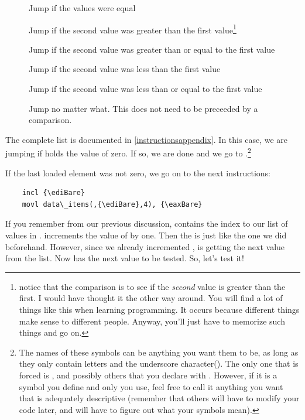 \begin{description}
\item[] Jump if the values were equal
\item[] Jump if the second value was greater than the first 
value\footnote{notice that the comparison is to see if the
\emph{second} value is greater than the first.  I
would have thought it the other way around.  You will find a lot of
things like this when learning programming.  It occurs because different
things make sense to different people.  Anyway, you'll just have to
memorize such things and go on.}
\item[] Jump if the second value was greater than or equal to the first value
\item[] Jump if the second value was less than the first value
\item[] Jump if the second value was less than or equal to the first value
\item[] Jump no matter what.  This does not need to be preceeded by a 
comparison.
\end{description}

The complete list is documented in \autoref{instructionsappendix}.
In this case, we are jumping if {\eaxReg} holds the value
of zero.  If so, we are done and we go to 
.\footnote{The names of these symbols
can be anything you want them to be, as long as they only contain letters
and the underscore character(\icode{\_}).  The only one that
is forced is , and possibly others that you
declare with .  However, if it is a symbol you
define and only you use, feel free to call it anything you want that is 
adequately descriptive (remember that others will have to modify your code 
later, and will have to figure out what your symbols mean).
}

If the last loaded element was not zero, we go on to the next instructions:

\begin{simpletyping}
\begin{lstlisting}
	incl {\ediBare}
	movl data\_items(,{\ediBare},4), {\eaxBare}
\end{lstlisting}
\end{simpletyping}

If you remember from our previous discussion, {\ediReg} contains
the index to 
our list of values in .
increments the value of {\ediReg} by
one.  Then the  is just like the one we did 
beforehand.  However, since we already incremented {\ediReg}, {\eaxReg} is getting the
next value from the list.  Now {\eaxReg} has the next value to be tested.  
So, let's test it!

